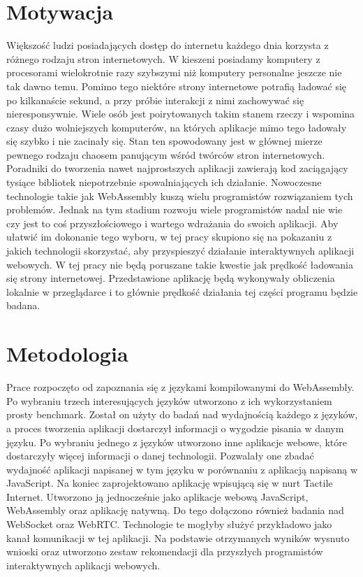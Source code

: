 \documentclass[language=polish,type=master]{aghmodern}
\begin{document}
\section{Motywacja}
Większość ludzi posiadających dostęp do internetu każdego dnia korzysta z różnego rodzaju stron internetowych.
W kieszeni posiadamy komputery z procesorami wielokrotnie razy szybszymi niż komputery personalne jeszcze nie tak dawno temu.
Pomimo tego niektóre strony internetowe potrafią ładować się po kilkanaście sekund, a przy próbie interakcji z nimi zachowywać się nieresponsywnie.
Wiele osób jest poirytowanych takim stanem rzeczy i wspomina czasy dużo wolniejszych komputerów, na których aplikacje mimo tego ładowały się szybko i nie zacinały się.
Stan ten spowodowany jest w głównej mierze pewnego rodzaju chaosem panującym wśród twórców stron internetowych.
Poradniki do tworzenia nawet najprostszych aplikacji zawierają kod zaciągający tysiące bibliotek niepotrzebnie spowalniających ich działanie.
Nowoczesne technologie takie jak WebAssembly kuszą wielu programistów rozwiązaniem tych problemów.
Jednak na tym stadium rozwoju wiele programistów nadal nie wie czy jest to coś przyszłościowego i wartego wdrażania do swoich aplikacji.
Aby ułatwić im dokonanie tego wyboru, w tej pracy skupiono się na pokazaniu z jakich technologii skorzystać, aby przyspieszyć działanie interaktywnych aplikacji webowych.
W tej pracy nie będą poruszane takie kwestie jak prędkość ładowania się strony internetowej.
Przedstawione aplikację będą wykonywały obliczenia lokalnie w przeglądarce i to głównie prędkość działania tej części programu będzie badana.

\section{Metodologia}
Prace rozpoczęto od zapoznania się z językami kompilowanymi do WebAssembly.
Po wybraniu trzech interesujących języków utworzono z ich wykorzystaniem prosty benchmark.
Został on użyty do badań nad wydajnością każdego z języków, a proces tworzenia aplikacji dostarczył informacji o wygodzie pisania w danym języku.
Po wybraniu jednego z języków utworzono inne aplikacje webowe, które dostarczyły więcej informacji o danej technologii.
Pozwalały one zbadać wydajność aplikacji napisanej w tym języku w porównaniu z aplikacją napisaną w JavaScript.
Na koniec zaprojektowano aplikację wpisującą się w nurt Tactile Internet.
Utworzono ją jednocześnie jako aplikacje webową JavaScript, WebAssembly oraz aplikację natywną.
Do tego dołączono również badania nad WebSocket oraz WebRTC.
Technologie te mogłyby służyć przykładowo jako kanał komunikacji w tej aplikacji.
Na podstawie otrzymanych wyników wysnuto wnioski oraz utworzono zestaw rekomendacji dla przyszłych programistów interaktywnych aplikacji webowych.
\end{document}
